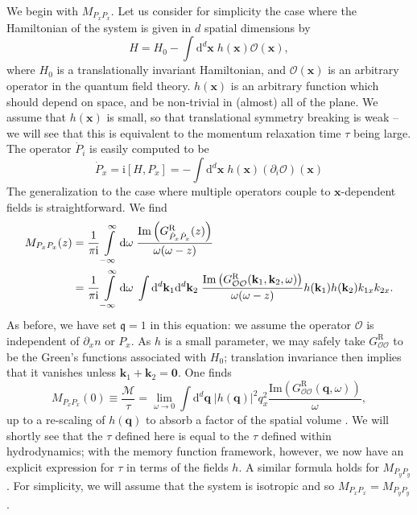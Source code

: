 \documentclass[10pt, oneside]{book}
\begin{document}
\begin{doublespace}
We begin with $M_{P_xP_x}$.    Let us consider for simplicity the case where the Hamiltonian of the system is given in $d$ spatial dimensions 
by \begin{equation}
H = H_0 - \int\mathrm{d}^d\mathbf{x}\; h(\mathbf{x}) \mathcal{O}(\mathbf{x}), \label{Pdot}
\end{equation}where $H_0$ is a translationally invariant Hamiltonian, and $\mathcal{O}(\mathbf{x})$ is an arbitrary operator in the quantum field theory.   $h(\mathbf{x})$ is an arbitrary function which should depend on space, and be non-trivial in (almost) all of the plane.   We assume that $h(\mathbf{x})$ is small, so that translational symmetry breaking is weak -- we will see that this is equivalent to the momentum relaxation time $\tau$ being large.    The operator $\dot{P}_i$ is easily computed to be \begin{equation}
\dot{P}_x = \mathrm{i}[H,P_x] = - \int \mathrm{d}^d\mathbf{x} \; h(\mathbf{x}) (\partial_i \mathcal{O})(\mathbf{x}) \label{Pdot2}
\end{equation}
The generalization to the case where multiple operators couple to $\mathbf{x}$-dependent fields is straightforward.   We find \begin{align}
M_{P_xP_x}(z) &= \frac{1}{\pi\mathrm{i}}\int\limits_{-\infty}^\infty \mathrm{d}\omega \; \frac{\mathrm{Im}\left(G^{\mathrm{R}}_{\dot{P}_x\dot{P}_x}(z)\right)}{\omega(\omega-z)}  \notag \\
&= \frac{1}{\pi\mathrm{i}}\int\limits_{-\infty}^\infty \mathrm{d}\omega \; \int \mathrm{d}^d\mathbf{k}_1\mathrm{d}^d\mathbf{k}_2 \; \frac{\mathrm{Im}\left(G^{\mathrm{R}}_{\mathcal{OO}}(\mathbf{k}_1,\mathbf{k}_2,\omega)\right) }{\omega(\omega-z)}  h(\mathbf{k}_1)h(\mathbf{k}_2)  k_{1x}k_{2x}.
\end{align}
As before, we have set $\mathfrak{q}=1$ in this equation:  we assume the operator $\mathcal{O}$ is independent of $\partial_x n$ or $P_x$.    As $h$ is a small parameter, we may safely take $G^{\mathrm{R}}_{\mathcal{OO}}$ to be the Green's functions associated with $H_0$;  translation invariance then implies that it vanishes unless $\mathbf{k}_1+\mathbf{k}_2=\mathbf{0}$.   One finds \cite{hkms,Hartnoll:2012rj,lucas1401, Lucas:2015vna} \begin{equation}
M_{P_xP_x}(0) \equiv \frac{\mathcal{M}}{\tau} = \lim_{\omega\rightarrow 0} \int \mathrm{d}^d\mathbf{q} \; |h(\mathbf{q})|^2 q_x^2 \frac{\mathrm{Im}\left(G^{\mathrm{R}}_{\mathcal{OO}}(\mathbf{q},\omega)\right)}{\omega},
\end{equation}up to a re-scaling of $h(\mathbf{q})$ to absorb a factor of the spatial volume \cite{Lucas:2015vna}.
We will shortly see that the $\tau$ defined here is equal to the $\tau$ defined within hydrodynamics;   with the memory function framework, however, we now have an explicit expression for $\tau$ in terms of the fields $h$.    A similar formula holds for $M_{P_yP_y}$.   For simplicity, we will assume that the system is isotropic and so $M_{P_xP_x} = M_{P_yP_y}$.


\end{doublespace}
\end{document}
